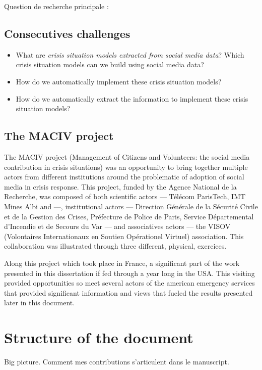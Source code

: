 Question de recherche principale :

\subsection{Consecutives challenges}
\begin{itemize}
    \item What are \emph{crisis situation models extracted from social media data}?
          Which crisis situation models can we build using social media data?
    \item How do we automatically implement these crisis situation models?
    \item How do we automatically extract the information to implement these crisis situation models?
\end{itemize}

\subsection{The MACIV project}
The MACIV project (Management of Citizens and Volunteers: the social media contribution in crisis situations)
was an opportunity to bring together multiple actors from different institutions around the problematic
of adoption of social media in crisis response. This project, funded by the Agence National de la Recherche,
was composed of both scientific actors — Télécom ParisTech, IMT Mines Albi and —, institutional actors — Direction Générale
de la Sécurité Civile et de la Gestion des Crises, Préfecture de Police de Paris, Service Départemental d'Incendie
et de Secours du Var — and associatives actors — the VISOV (Volontaires Internationaux en Soutien Opérationel Virtuel) association.
This collaboration was illustrated through three different, physical, exercices.

Along this project which took place in France, a significant part of the work presented in this
dissertation if fed through a year long in the USA.
This visiting provided opportunities so meet several actors of the american emergency services that
provided significant information and views that fueled the results presented later in this document.

\section{Structure of the document}
Big picture.
Comment mes contributions s'articulent dans le manuscript.




